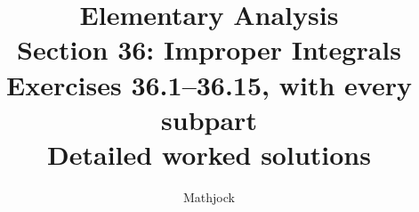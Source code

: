 
\title{\textbf{Elementary Analysis}\\[0.3em]
Section 36: Improper Integrals\\[0.4em]
\large Exercises 36.1--36.15, with every subpart\\
Detailed worked solutions}
\author{Mathjock}
\date{}

\maketitle
\bookinfo
\tableofcontents
\clearpage
\setcounter{section}{35}


